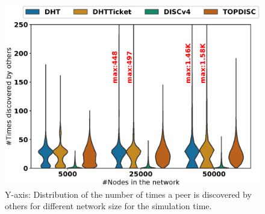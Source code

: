\begin{figure}[!h]
\includegraphics[width=\linewidth]{results/no_split/violin_size_wasDiscovered.eps}
\caption{Y-axis: Distribution of the number of times a peer is discovered by others for different network size for the simulation time.}
\label{fig:efficiency_size}
\end{figure}
\fi 
%
%
%
%
%

